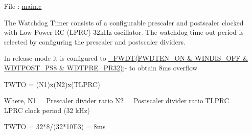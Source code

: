 File \+: \hyperlink{a00048}{main.\+c} \begin{DoxyVerb}\end{DoxyVerb}


The Watchdog Timer consists of a configurable prescaler and postscaler clocked with Low-\/\+Power R\+C (L\+P\+R\+C) 32k\+Hz oscillator. The watchdog time-\/out period is selected by configuring the prescaler and postscaler dividers.

In release mode it is configured to \hyperlink{a00014_af24dea78c3111674d8bd9d621f1023ad}{\+\_\+\+F\+W\+D\+T(\+F\+W\+D\+T\+E\+N\+\_\+\+O\+N \& W\+I\+N\+D\+I\+S\+\_\+\+O\+F\+F \& W\+D\+T\+P\+O\+S\+T\+\_\+\+P\+S8 \& W\+D\+T\+P\+R\+E\+\_\+\+P\+R32)};-\/ to obtain 8ms overflow

\begin{DoxyVerb}            TWTO = (N1)x(N2)x(TLPRC)

            Where,
            N1 = Prescaler divider ratio
            N2 = Postscaler divider ratio
            TLPRC = LPRC clock period (32 kHz)

            TWTO = 32*8/(32*10E3) = 8ms\end{DoxyVerb}
 